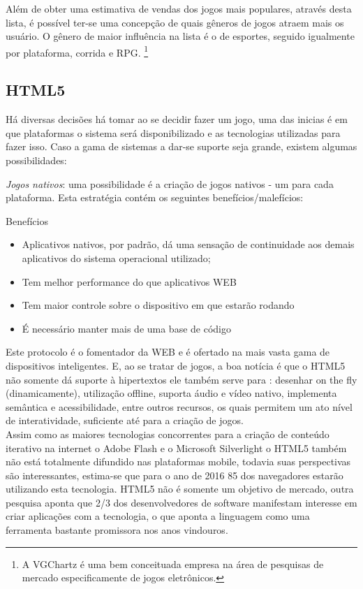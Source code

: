\documentclass{article}
\begin{document}
Além de obter uma estimativa de vendas dos jogos mais populares, através desta lista, é possível ter-se uma concepção de quais gêneros de jogos atraem mais os usuário. O gênero de maior influência na lista é o de esportes, seguido igualmente por plataforma, corrida e RPG.
\footnote{A VGChartz é uma bem conceituada   empresa na área de pesquisas de mercado especificamente de jogos eletrônicos.}


\subsection{HTML5}

Há diversas decisões há tomar ao se decidir fazer um jogo, uma das inicias é em que plataformas o sistema será disponibilizado e as tecnologias utilizadas para fazer isso. Caso a gama de sistemas a dar-se suporte seja grande, existem algumas possibilidades: 

\emph{Jogos nativos}: uma possibilidade é a criação de jogos nativos - um para cada plataforma. Esta estratégia contém os seguintes benefícios/malefícios: 

Benefícios
\begin{itemize}
\item  Aplicativos nativos, por padrão, dá uma sensação de continuidade aos demais aplicativos do sistema operacional utilizado;
\item Tem melhor performance do que aplicativos WEB
\item Tem maior controle sobre o dispositivo em que estarão rodando
\end{itemize}


\begin{itemize}
\item É necessário manter mais de uma base de código 
\end{itemize}




Este protocolo é o fomentador da WEB e é ofertado na mais vasta gama de dispositivos inteligentes. E, ao se tratar de jogos, a boa notícia é que o HTML5 não somente dá suporte à hipertextos ele também serve para : desenhar on the fly (dinamicamente), utilização offline, suporta  áudio e vídeo nativo, implementa semântica e acessibilidade, entre outros recursos, os quais permitem um ato nível de interatividade, suficiente até para a criação de jogos.
\\
	Assim como as  maiores tecnologias concorrentes para a criação de conteúdo iterativo na internet o Adobe Flash e o Microsoft Silverlight o HTML5 também não está totalmente difundido nas plataformas mobile, todavia suas perspectivas são interessantes, estima-se que para o ano de 2016 85 dos navegadores estarão utilizando esta tecnologia. HTML5 não é somente um objetivo de mercado, outra pesquisa aponta que 2/3 dos desenvolvedores de software manifestam interesse em criar aplicações com a tecnologia, o que aponta a linguagem como uma ferramenta bastante promissora nos anos vindouros.
\end{document}
